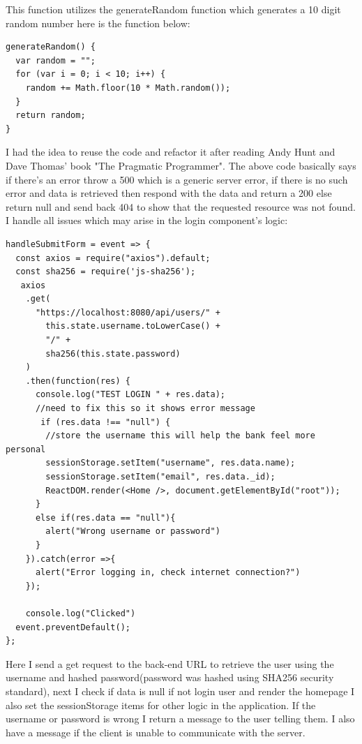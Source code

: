 This function utilizes the generateRandom function which generates a 10 digit random number here is the function below:
\begin{verbatim}
generateRandom() {
  var random = "";
  for (var i = 0; i < 10; i++) {
    random += Math.floor(10 * Math.random());
  }
  return random;
}
\end{verbatim}
I had the idea to reuse the code and refactor it after reading Andy Hunt and Dave Thomas' book "The Pragmatic Programmer"\cite{PragmaticProgrammer}.  The above code basically says if there's an error throw a 500 which is a generic server error, if there is no such error and data is retrieved then respond with the data and return a 200 else return null and send back 404 to show that the requested resource was not found.  I handle all issues which may arise in the login component's logic:
\begin{verbatim}
handleSubmitForm = event => {
  const axios = require("axios").default;
  const sha256 = require('js-sha256');
   axios
    .get(
      "https://localhost:8080/api/users/" +
        this.state.username.toLowerCase() +
        "/" +
        sha256(this.state.password)
    )
    .then(function(res) {
      console.log("TEST LOGIN " + res.data);
      //need to fix this so it shows error message
       if (res.data !== "null") {
        //store the username this will help the bank feel more personal
        sessionStorage.setItem("username", res.data.name);
        sessionStorage.setItem("email", res.data._id);
        ReactDOM.render(<Home />, document.getElementById("root"));
      }
      else if(res.data == "null"){
        alert("Wrong username or password")
      }
    }).catch(error =>{
      alert("Error logging in, check internet connection?")
    });

    console.log("Clicked")
  event.preventDefault();
};
\end{verbatim}
Here I send a get request to the back-end URL to retrieve the user using the username and
hashed password(password was hashed using SHA256 security standard), next I check if data is null
if not login user and render the homepage I also set the sessionStorage items for other logic in the application.
If the username or password is wrong I return a message to the user telling them.  I also have a message if the
client is unable to communicate with the server.
\\
\\
